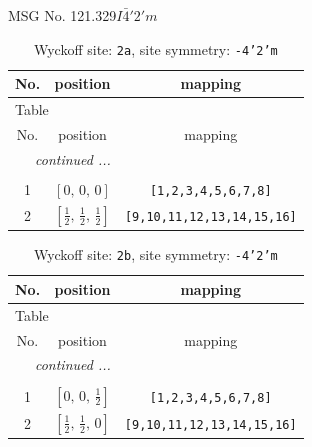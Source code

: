 \documentclass[fleqn,8pt]{jsarticle}
\begin{document}
\setcounter{MaxMatrixCols}{32}

\renewcommand{\tablename}{Table~}
\renewcommand{\figurename}{Figure~}
\begin{center}
\LARGE
MSG No. 121.329\quad$I\bar{4}'2'm$
\end{center}
\renewcommand{\arraystretch}{1.2}
\begin{longtable}{ccc}
\caption{Wyckoff site: {\tt 2a}, site symmetry: {\tt -4'2'm}}
 \\
 \hline \hline
No. & position & mapping \\ \hline \endfirsthead

\multicolumn{2}{l}{\tablename\ \thetable{}} \\
 \hline \hline
No. & position & mapping \\ \hline \endhead

 \hline \hline
\multicolumn{2}{r}{\footnotesize\it continued ...} \\ \endfoot

 \hline \hline
\multicolumn{2}{r}{} \\ \endlastfoot

1 & $\left[ 0,\, 0,\, 0 \right]$ & {\tt [1,2,3,4,5,6,7,8]} \\ \hline
2 & $\left[ \frac{1}{2},\, \frac{1}{2},\, \frac{1}{2} \right]$ & {\tt [9,10,11,12,13,14,15,16]} \\
\end{longtable}
\renewcommand{\arraystretch}{1.2}
\begin{longtable}{ccc}
\caption{Wyckoff site: {\tt 2b}, site symmetry: {\tt -4'2'm}}
 \\
 \hline \hline
No. & position & mapping \\ \hline \endfirsthead

\multicolumn{2}{l}{\tablename\ \thetable{}} \\
 \hline \hline
No. & position & mapping \\ \hline \endhead

 \hline \hline
\multicolumn{2}{r}{\footnotesize\it continued ...} \\ \endfoot

 \hline \hline
\multicolumn{2}{r}{} \\ \endlastfoot

1 & $\left[ 0,\, 0,\, \frac{1}{2} \right]$ & {\tt [1,2,3,4,5,6,7,8]} \\ \hline
2 & $\left[ \frac{1}{2},\, \frac{1}{2},\, 0 \right]$ & {\tt [9,10,11,12,13,14,15,16]} \\
\end{longtable}
\end{document}
